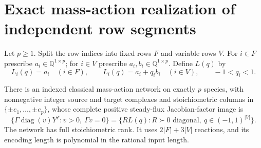 \section{Exact mass-action realization of independent row segments}
\label{sec:row-realization-independent}

Let $p\geq1$. Split the row indices into fixed rows $F$ and variable rows
$V$. For $i\in F$ prescribe $a_i\in\mathbb Q^{1\times p}$; for
$i\in V$ prescribe $a_i,b_i\in\mathbb Q^{1\times p}$. Define $L(q)$ by
\[
 L_i(q)=a_i\quad(i\in F),\qquad
 L_i(q)=a_i+q_i b_i\quad(i\in V),
 \qquad -1<q_i<1.
\]

\begin{theorem}
\label{thm:row-realization-independent}
There is an indexed classical mass-action network on exactly $p$ species,
with nonnegative integer source and target complexes and stoichiometric
columns in $\{\pm e_1,\ldots,\pm e_p\}$, whose complete positive steady-flux
Jacobian-factor image is
\[
 \bigl\{\Gamma\operatorname{diag}(v)Y^T:
          v>0,\ \Gamma v=0\bigr\}
 =\bigl\{R L(q):R\succ0\text{ diagonal},\ q\in(-1,1)^{|V|}\bigr\}.
 \tag{RS}
\]
The network has full stoichiometric rank. It uses $2|F|+3|V|$ reactions,
and its encoding length is polynomial in the rational input length.
\end{theorem}

